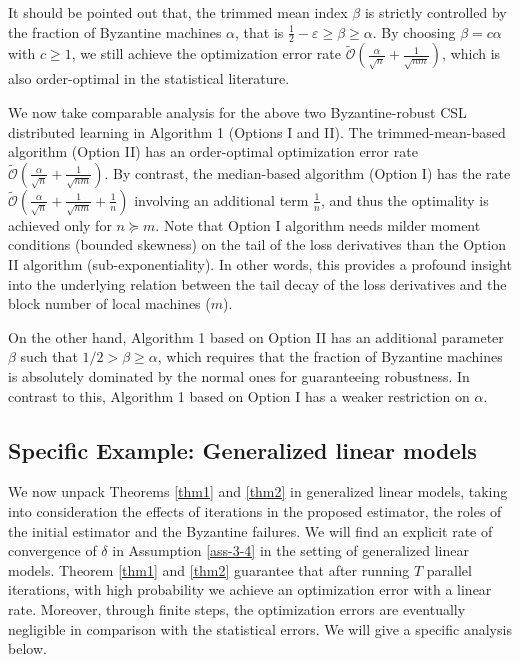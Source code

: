 \documentclass[12pt,a4paper]{article}%
\numberwithin{equation}{section}
\newcommand{\sbr}[1]{\left(#1\right)}        %
\begin{document}
It should be pointed out that, the trimmed mean index $\beta$ is strictly controlled by the fraction of Byzantine machines $\alpha$, that is  $\frac{1}{2}-\varepsilon\geq\beta\geq\alpha$. By choosing $\beta=c\alpha$ with $c\geq1$, {we still achieve the optimization error rate $\mathcal{\tilde{O}}\sbr{\frac{\alpha}{\sqrt{n}}+\frac{1}{\sqrt{nm}}}$, which  is also  order-optimal in the statistical literature.}

We now take comparable analysis for the above two Byzantine-robust CSL distributed learning in  Algorithm 1 (Options I and II). The trimmed-mean-based algorithm (Option II) has an order-optimal optimization error rate $\mathcal{\tilde{O}}\sbr{\frac{\alpha}{\sqrt{n}}+\frac{1}{\sqrt{nm}}}$. By contrast, the median-based algorithm (Option I) has the rate $\tilde{\mathcal{O}}\sbr{\frac{\alpha}{\sqrt{n}}+\frac{1}{\sqrt{nm}}+\frac{1}{n}}$ involving an additional term $\frac{1}{n}$, and thus the optimality is achieved only for $n\succeq m$.
Note that Option I algorithm needs milder moment conditions (bounded skewness) on the tail of the loss derivatives than the Option II algorithm (sub-exponentiality). In other words, this provides a profound insight into the underlying relation between the tail decay of the loss derivatives and the block number of local machines ($m$).

On the other hand,  Algorithm 1 based on Option II has an additional parameter  $\beta$ such that $1/2>\beta\geq \alpha$, which requires that the fraction of Byzantine machines is absolutely dominated by the normal ones for guaranteeing robustness. In contrast to this, Algorithm 1 based on Option I  has a weaker restriction on $\alpha$.




\subsection{Specific Example: Generalized linear models}\label{subsec3-2}
We now unpack Theorems \ref{thm1} and \ref{thm2} in generalized linear models, taking into consideration the effects of iterations in the proposed  estimator, the roles of the initial estimator and the Byzantine failures. We will find an explicit rate of convergence of $\delta$ in Assumption \ref{ass-3-4} in the setting of generalized linear models. Theorem \ref{thm1} and \ref{thm2} guarantee that after running $T$ parallel iterations, with high probability we achieve an optimization error with a linear rate. Moreover, through finite steps, the optimization errors are eventually negligible in comparison with the statistical errors. We will give a specific analysis below.
\end{document}
